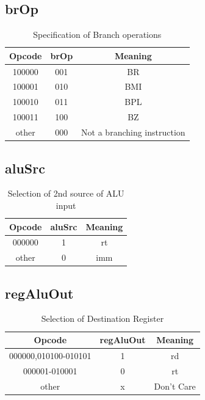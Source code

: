 \documentclass{article}
\begin{document}
\subsection{brOp}
\begin{table}[H]
    \centering
    \begin{tabular}{|c|c|c|}
        \hline
        \textbf{Opcode} & \textbf{brOp} & \textbf{Meaning} \\
        \hline
        100000 & 001 & BR \\
        100001 & 010 & BMI \\
        100010 & 011 & BPL \\
        100011 & 100 & BZ \\
        other & 000 & Not a branching instruction \\
        \hline
    \end{tabular}
    \caption{Specification of Branch operations}
\end{table}

\subsection{aluSrc}
\begin{table}[H]
    \centering
    \begin{tabular}{|c|c|c|}
        \hline
        \textbf{Opcode} & \textbf{aluSrc} & \textbf{Meaning} \\
        \hline
        000000 & 1 & rt \\
        other & 0 & imm \\
        \hline
    \end{tabular}
    \caption{Selection of 2nd source of ALU input}
\end{table}

\subsection{regAluOut}
\begin{table}[H]
    \centering
    \begin{tabular}{|c|c|c|}
        \hline
        \textbf{Opcode} & \textbf{regAluOut} & \textbf{Meaning} \\
        \hline
        000000,010100-010101 & 1 & rd \\
        000001-010001 & 0 & rt \\
        other & x & Don't Care \\
        \hline
    \end{tabular}
    \caption{Selection of Destination Register}
\end{table}
\end{document}
